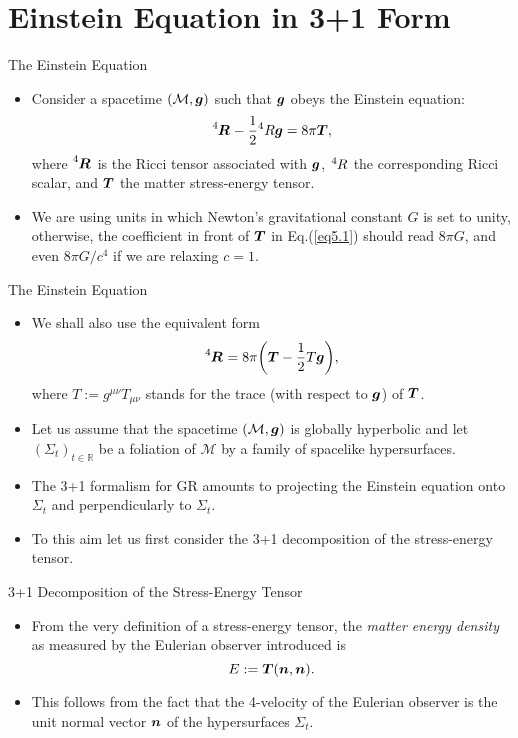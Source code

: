 \documentclass[10pt]{sintefbeamer}
\begin{document}
\section{Einstein Equation in 3+1 Form}

\begin{frame}{The Einstein Equation}
	\begin{itemize}
		\item Consider a spacetime $(\mathcal{M}, \vb*{g})$ such that $\vb*{g}$ obeys the Einstein equation:
		\begin{equation}
			\label{eq5.1}
			\tensor[^4]{\vb*{R}}{}  - \dfrac{1}{2}{}^4 R\vb*{g} = 8 \pi \vb*{T},
		\end{equation}
		where $\tensor[^4]{\vb*{R}}{}$ is the Ricci tensor associated with $\vb*{g}$, $\tensor[^4]{R}{}$ the corresponding Ricci scalar, and $\vb*{T}$ the matter stress-energy tensor.
		\item We are using units in which Newton's gravitational constant $G$ is set to unity, otherwise, the coefficient in front of $\vb*{T}$ in Eq.(\ref{eq5.1}) should read $8\pi G$, and even $8\pi G / c^4$ if we are relaxing $c=1$.
	\end{itemize}
\end{frame}

\begin{frame}{The Einstein Equation}
	\begin{itemize}
		\item We shall also use the equivalent form
		\begin{equation}
			\label{eq5.2}
			\tensor[^4]{\vb*{R}}{} = 8\pi \qty(\vb*{T} - \dfrac{1}{2}T\vb*{g}),
		\end{equation}
		where $T:=g^{\mu\nu}T_{\mu\nu}$ stands for the trace (with respect to $\vb*{g}$) of $\vb*{T}$.
		\item Let us assume that the spacetime $(\mathcal{M}, \vb*{g})$ is globally hyperbolic and let $(\Sigma_t)_{t\in \mathbb{R}}$ be a foliation of $\mathcal{M}$ by a family of spacelike hypersurfaces.
		\item The 3+1 formalism for GR amounts to projecting the Einstein equation onto $\Sigma_t$ and perpendicularly to $\Sigma_t$.
		\item To this aim let us first consider the 3+1 decomposition of the stress-energy tensor.
	\end{itemize}
\end{frame}

\begin{frame}{3+1 Decomposition of the Stress-Energy Tensor}
	\begin{itemize}
		\item From the very definition of a stress-energy tensor, the \emph{matter energy density} as measured by the Eulerian observer introduced is
		\begin{equation}
			E:= \vb*{T}(\vb*{n}, \vb*{n}).
		\end{equation}
		\item This follows from the fact that the 4-velocity of the Eulerian observer is the unit normal vector $\vb*{n}$ of the hypersurfaces $\Sigma_t$.
	\end{itemize}
\end{frame}


\end{document}
